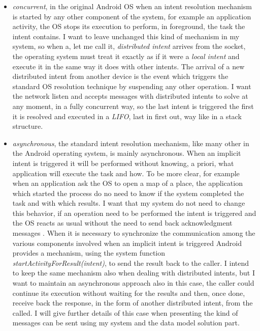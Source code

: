  \begin{itemize}
	\item \textit{concurrent}, in the original Android OS when an intent resolution mechanism is started by any other component of the system, for example an application activity, the OS stops its execution to perform, in foreground, the task the intent contains. I want to leave unchanged this kind of mechanism in my system, so when a, let me call it, \textit{distributed intent} arrives from the socket, the operating system must treat it exactly as if it were a \textit{local intent} and execute it in the same way it does with other intents. The arrival of a new distributed intent from another device is the event which triggers the standard OS resolution technique by suspending any other operation. I want the network listen and accepts messages with distributed intents to solve at any moment, in a fully concurrent way, so the last intent is triggered the first it is resolved and executed in a \textit{LIFO}, last in first out, way like in a stack structure.
	\item \textit{asynchronous}, the standard intent resolution mechanism, like many other in the Android operating system, is mainly asynchronous. When an implicit intent is triggered it will be performed without knowing, a priori, what application will execute the task and how. To be more clear, for example when an application ask the OS to open a map of a place, the application which started the process do no need to know if the system completed the task and with which results. I want that my system do not need to change this behavior, if an operation need to be performed the intent is triggered and the OS reacts as usual without the need to send back acknowledgment messages . When it is necessary to synchronize the communication among the various components involved when an implicit intent is triggered Android provides a mechanism, using the system function \textit{startActivityForResult(intent)}, to send the result back to the caller. I intend to keep the same mechanism also when dealing with distributed intents, but I want to maintain an asynchronous approach also in this case, the caller could continue its execution without waiting for the results and then, once done, receive back the response, in the form of another distributed intent, from the called. I will give further details of this case when presenting the kind of messages can be sent using my system and the data model solution part.
 \end{itemize}

